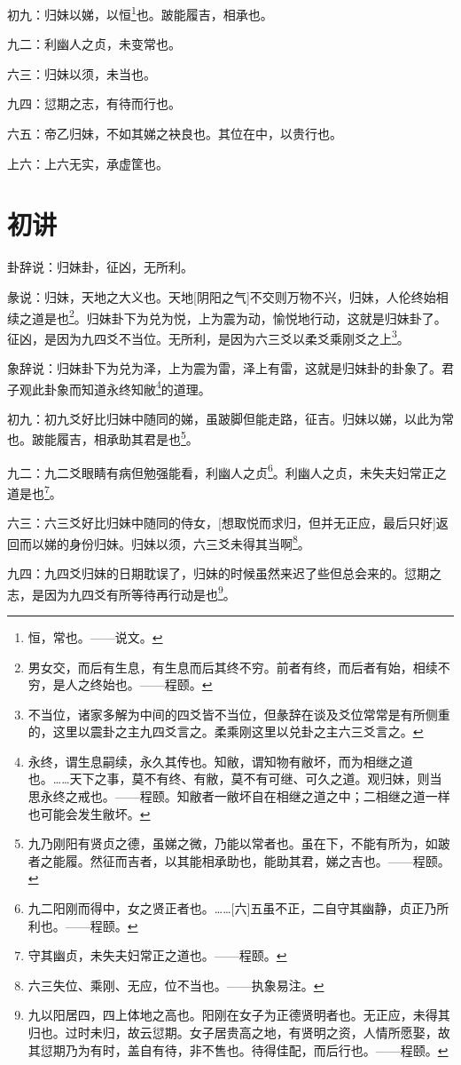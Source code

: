 \documentclass[12pt,oneside]{book}
\begin{document}
初九：归妹以娣，以恒\footnote{恒，常也。——说文。}也。跛能履吉，相承也。

九二：利幽人之贞，未变常也。

六三：归妹以须，未当也。

九四：愆期之志，有待而行也。

六五：帝乙归妹，不如其娣之袂良也。其位在中，以贵行也。

上六：上六无实，承虚筐也。


\section{初讲}
卦辞说：归妹卦，征凶，无所利。

彖说：归妹，天地之大义也。天地[阴阳之气]不交则万物不兴，归妹，人伦终始相续之道是也\footnote{男女交，而后有生息，有生息而后其终不穷。前者有终，而后者有始，相续不穷，是人之终始也。——程颐。}。归妹卦下为兑为悦，上为震为动，愉悦地行动，这就是归妹卦了。征凶，是因为九四爻不当位。无所利，是因为六三爻以柔爻乘刚爻之上\footnote{不当位，诸家多解为中间的四爻皆不当位，但彖辞在谈及爻位常常是有所侧重的，这里以震卦之主九四爻言之。柔乘刚这里以兑卦之主六三爻言之。}。

象辞说：归妹卦下为兑为泽，上为震为雷，泽上有雷，这就是归妹卦的卦象了。君子观此卦象而知道永终知敝\footnote{永终，谓生息嗣续，永久其传也。知敝，谓知物有敝坏，而为相继之道也。……天下之事，莫不有终、有敝，莫不有可继、可久之道。观归妹，则当思永终之戒也。——程颐。知敝者一敝坏自在相继之道之中；二相继之道一样也可能会发生敝坏。}的道理。

初九：初九爻好比归妹中随同的娣，虽跛脚但能走路，征吉。归妹以娣，以此为常也。跛能履吉，相承助其君是也\footnote{九乃刚阳有贤贞之德，虽娣之微，乃能以常者也。虽在下，不能有所为，如跛者之能履。然征而吉者，以其能相承助也，能助其君，娣之吉也。——程颐。}。

九二：九二爻眼睛有病但勉强能看，利幽人之贞\footnote{九二阳刚而得中，女之贤正者也。……[六]五虽不正，二自守其幽静，贞正乃所利也。——程颐。}。利幽人之贞，未失夫妇常正之道是也\footnote{守其幽贞，未失夫妇常正之道也。——程颐。}。

六三：六三爻好比归妹中随同的侍女，[想取悦而求归，但并无正应，最后只好]返回而以娣的身份归妹。归妹以须，六三爻未得其当啊\footnote{六三失位、乘刚、无应，位不当也。——执象易注。}。

九四：九四爻归妹的日期耽误了，归妹的时候虽然来迟了些但总会来的。愆期之志，是因为九四爻有所等待再行动是也\footnote{九以阳居四，四上体地之高也。阳刚在女子为正德贤明者也。无正应，未得其归也。过时未归，故云愆期。女子居贵高之地，有贤明之资，人情所愿娶，故其愆期乃为有时，盖自有待，非不售也。待得佳配，而后行也。——程颐。}。
\end{document}
